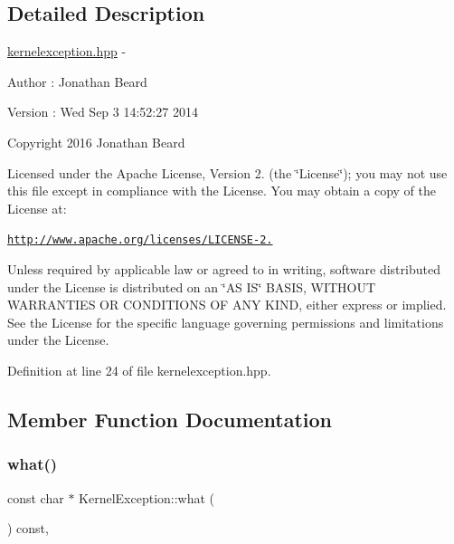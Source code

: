 \subsection{Detailed Description}
\hyperlink{kernelexception_8hpp_source}{kernelexception.\+hpp} -\/ \begin{DoxyAuthor}{Author}
\+: Jonathan Beard 
\end{DoxyAuthor}
\begin{DoxyVersion}{Version}
\+: Wed Sep 3 14\+:52\+:27 2014
\end{DoxyVersion}
Copyright 2016 Jonathan Beard

Licensed under the Apache License, Version 2. (the \char`\"{}\+License\char`\"{}); you may not use this file except in compliance with the License. You may obtain a copy of the License at\+:

\href{http://www.apache.org/licenses/LICENSE-2.0}{\tt http\+://www.\+apache.\+org/licenses/\+L\+I\+C\+E\+N\+S\+E-\/2.}

Unless required by applicable law or agreed to in writing, software distributed under the License is distributed on an \char`\"{}\+A\+S I\+S\char`\"{} B\+A\+S\+IS, W\+I\+T\+H\+O\+UT W\+A\+R\+R\+A\+N\+T\+I\+ES OR C\+O\+N\+D\+I\+T\+I\+O\+NS OF A\+NY K\+I\+ND, either express or implied. See the License for the specific language governing permissions and limitations under the License. 

Definition at line 24 of file kernelexception.\+hpp.



\subsection{Member Function Documentation}
\hypertarget{class_kernel_exception_a09317e64fd4bd4244df6fb7d687b609b}{}\label{class_kernel_exception_a09317e64fd4bd4244df6fb7d687b609b} 
\subsubsection{\texorpdfstring{what()}{what()}}
{\footnotesize\ttfamily const char $\ast$ Kernel\+Exception\+::what (\begin{DoxyParamCaption}{ }\end{DoxyParamCaption}) const\hspace{0.3cm}{\ttfamily [virtual]}, {\ttfamily [noexcept]}}

